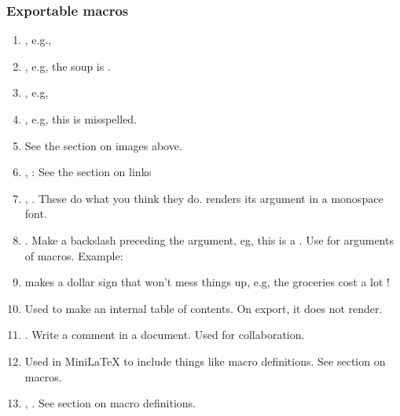 \subsubsection{Exportable macros}

\begin{enumerate}

\item {}, e.g., 

\item {}, e.g, the soup is .

\item {}, e.g, 

\item {}, e.g, this is  misspelled.

\item {} See the section on images above.

\item {},  : See the section on links

\item  {},  .  These do what you think they do.    renders its argument in a monospace font.

\item  {}.  Make a backslash preceding the argument, eg, this is a .  Use  for arguments of macros. Example: 

\item  {} makes a dollar sign that won't mess things up, e.g, the groceries cost  a lot \dollar\dollar!

\item {} Used to make an internal table of contents.  On export, it does not render.

\item {}.  Write a comment in a document. Used for collaboration.

\item {} Used in MiniLaTeX to include things like macro definitions.  See section on macros.

\item {}, . See section on macro definitions.


\end{enumerate}

